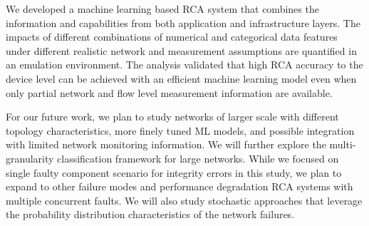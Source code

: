 We developed a machine learning based RCA system that combines the information and capabilities from both application and infrastructure layers. 
The impacts of different combinations of numerical and categorical data features under different realistic network and measurement assumptions are quantified in an emulation environment. 
The analysis validated that high RCA accuracy to the device level can be achieved with an efficient machine learning model even when only partial network and flow level measurement information are available.

For our future work, we plan to study networks of larger scale with different topology characteristics, more finely tuned ML models, and possible integration with limited network monitoring information. We will further explore the multi-granularity classification framework for large networks. While we focused on single faulty component scenario for integrity errors in this study, we plan to expand to other failure modes and performance degradation RCA systems with multiple concurrent faults. We will also study stochastic approaches that leverage the probability distribution characteristics of the network failures.  
